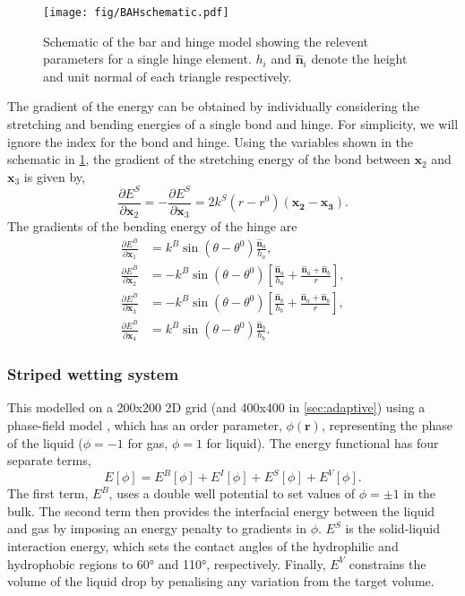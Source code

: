 \documentclass[twocolumn,10pt]{revtex4}
\begin{document}
\begin{figure}[htb]
  \texttt{[image: fig/BAHschematic.pdf]}
  \caption{\label{fig:BAHschematic}
    Schematic of the bar and hinge model showing the relevent parameters for a single hinge element. $h_i$ and $\bm{\hat{n}}_i$ denote the height and unit normal of each triangle respectively.
  }
\end{figure}
The gradient of the energy can be obtained by individually considering the stretching and bending energies of a single bond and hinge.
For simplicity, we will ignore the index for the bond and hinge.
Using the variables shown in the schematic in \cref{fig:BAHschematic}, the gradient of the stretching energy of the bond between $\bm{x}_2$ and $\bm{x}_3$ is given by,
\begin{equation}
  \frac{\partial E^S}{\partial \bm{x}_2} = - \frac{\partial E^S}{\partial \bm{x}_3} =
    2 k^S (r - r^0) (\bm{x_2} - \bm{x_3}).
\end{equation}
The gradients of the bending energy of the hinge are
\begin{align}
  \frac{\partial E^B}{\partial \bm{x}_1} &= k^B \sin(\theta - \theta^0) \frac{\bm{\hat{n}}_a}{h_a}, \\
  \frac{\partial E^B}{\partial \bm{x}_2} &= - k^B \sin(\theta - \theta^0) \left[\frac{\bm{\hat{n}}_a}{h_a} + \frac{\bm{\hat{n}}_a + \bm{\hat{n}}_b}{r}\right], \\
  \frac{\partial E^B}{\partial \bm{x}_3} &= - k^B \sin(\theta - \theta^0) \left[\frac{\bm{\hat{n}}_b}{h_b} + \frac{\bm{\hat{n}}_a + \bm{\hat{n}}_b}{r}\right], \\
  \frac{\partial E^B}{\partial \bm{x}_4} &= k^B \sin(\theta - \theta^0) \frac{\bm{\hat{n}}_b}{h_b}.
\end{align}

\subsubsection{Striped wetting system}
This modelled on a 200x200 2D grid (and 400x400 in \cref{sec:adaptive}) using a phase-field model \cite{Panter2019b}, which has an order parameter, $\phi(\bm{r})$, representing the phase of the liquid ($\phi=-1$ for gas, $\phi=1$ for liquid).
The energy functional has four separate terms,
\begin{equation} \label{eq:phasefield}
  E[\phi] = E^B[\phi] + E^I[\phi] + E^S[\phi] + E^V[\phi].
\end{equation}
The first term, $E^B$, uses a double well potential to set values of $\phi=\pm1$ in the bulk.
The second term then provides the interfacial energy between the liquid and gas by imposing an energy penalty to gradients in $\phi$.
$E^S$ is the solid-liquid interaction energy, which sets the contact angles of the hydrophilic and hydrophobic regions to 60\si{\degree} and 110\si{\degree}, respectively.
Finally, $E^V$ constrains the volume of the liquid drop by penalising any variation from the target volume.
\end{document}
